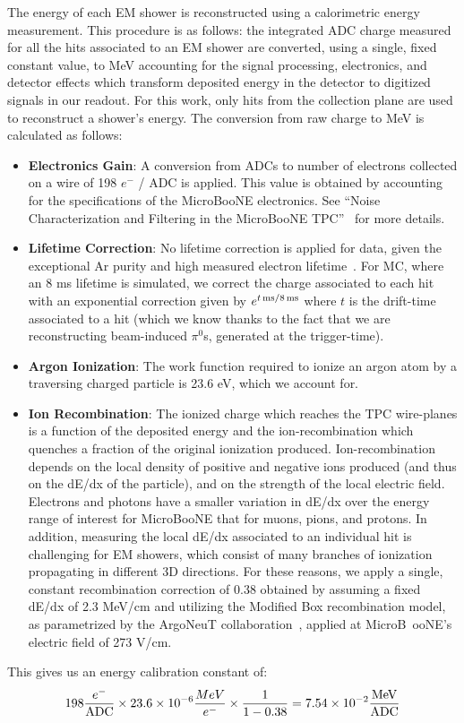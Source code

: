 \documentclass[12pt]{article}
\begin{document}
\par The energy of each EM shower is reconstructed using a calorimetric energy measurement. This procedure is as follows: the integrated ADC charge measured for all the hits associated to an EM shower are converted, using a single, fixed constant value, to MeV accounting for the signal processing, electronics, and detector effects which transform deposited energy in the detector to digitized signals in our readout. For this work, only hits from the collection plane are used to reconstruct a shower's energy. The conversion from raw charge to MeV is calculated as follows:
\begin{itemize}
\item {\bf Electronics Gain}: A conversion from ADCs to number of electrons collected on a wire of 198 $e^-$ / ADC is applied. This value is obtained by accounting for the specifications of the MicroBooNE electronics. See ``Noise Characterization and Filtering in the MicroBooNE TPC''~\cite{bib:noise} for more details.
\item {\bf Lifetime Correction}: No lifetime correction is applied for data, given the exceptional Ar purity and high measured electron lifetime~\cite{bib:purity}. For MC, where an 8 ms lifetime is simulated, we correct the charge associated to each hit with an exponential correction given by $e^{t \,{\rm ms} / 8 \,{\rm ms} }$ where $t$ is the drift-time associated to a hit (which we know thanks to the fact that we are reconstructing beam-induced $\pi^0$s, generated at the trigger-time).
\item {\bf Argon Ionization}: The work function required to ionize an argon atom by a traversing charged particle is 23.6 eV, which we account for.
\item {\bf Ion Recombination}: The ionized charge which reaches the TPC wire-planes is a function of the deposited energy and the ion-recombination which quenches a fraction of the original ionization produced. Ion-recombination depends on the local density of positive and negative ions produced (and thus on the dE/dx of the particle), and on the strength of the local electric field. Electrons and photons have a smaller variation in dE/dx over the energy range of interest for MicroBooNE that for muons, pions, and protons. In addition, measuring the local dE/dx associated to an individual hit is challenging for EM showers, which consist of many branches of ionization propagating in different 3D directions. For these reasons, we apply a single, constant recombination correction of 0.38 obtained by assuming a fixed dE/dx of 2.3 MeV/cm and utilizing the Modified Box recombination model, as parametrized by the ArgoNeuT collaboration~\cite{bib:argoneut_recomb}, applied at MicroB\
ooNE's electric field of 273 V/cm.
\end{itemize}
This gives us an energy calibration constant of:
\begin{equation}
  198 \frac{e^-}{\rm ADC} \times 23.6 \times 10^{-6} \frac{MeV}{e^-} \times \frac{1}{1-0.38} = 7.54 \times 10^{-2} \frac{\rm MeV}{\rm ADC}
\end{equation}
\end{document}
